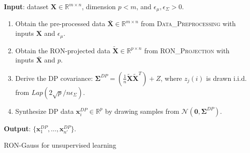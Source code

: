 \documentclass[USenglish,oneside,twocolumn]{article}
\newcommand{\noun}[1]{\textsc{#1}}
\theoremstyle{definition}
\theoremstyle{remark}
\theoremstyle{plain}
\theoremstyle{plain}
\begin{document}
\begin{algorithm}
{\small \par
\textbf{Input}{: dataset $\mathbf{X}\in\mathbb{R}^{m\times n}$,
dimension $p<m$, and $\epsilon_{\mu},\epsilon_{\Sigma}>0$. \vspace{0.5em}
}{\par}
\begin{enumerate}
\item {Obtain the pre-processed data $\bar{\mathbf{X}}\in\mathbb{R}^{m\times n}$
from }\noun{Data\_Preprocessing}{ with inputs $\mathbf{X}$
and $\epsilon_{\mu}$.}{ \par}
\item {Obtain the RON-projected data $\widetilde{\mathbf{X}}\in\mathbb{R}^{p\times n}$
from }\noun{RON\_Projection}{ with inputs $\bar{\mathbf{X}}$
and $p$.}{ \par}
\item {Derive the DP covariance: $\boldsymbol{\Sigma}^{DP}=(\frac{1}{n}\widetilde{\mathbf{X}}\widetilde{\mathbf{X}}^{T})+Z$,
where $z_{j}(i)$ is drawn i.i.d. from $Lap(2\sqrt{p}/n\epsilon_{\Sigma})$.}{\par}
\item {Synthesize DP data $\mathbf{x}_{i}^{DP}\in\mathbb{R}^{p}$
by drawing samples from $\mathcal{N}(\mathbf{0},\boldsymbol{\Sigma}^{DP})$.
\vspace{-0.5em}
}{ \par}
\end{enumerate}
\textbf{Output}{: $\{\mathbf{x}_{1}^{DP},\ldots,\mathbf{x}_{n'}^{DP}\}$.
}
}
\caption{RON-Gauss for unsupervised learning \label{alg:unsupervised}}
\end{algorithm}
\end{document}
